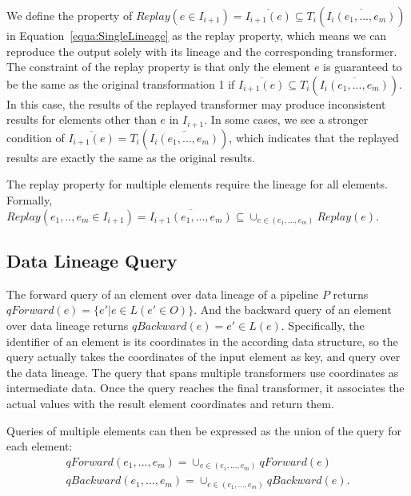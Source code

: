 \documentclass{sig-alternate}
\begin{document}
We define the property of $Replay(e \in I_{i+1}) = \overline{I_{i+1}(e)} \subseteq T_i(\overline{I_i(e_1, ..., e_m)})$ in Equation~\ref{equa:SingleLineage}
as the replay property, which means we can reproduce the output solely with its lineage and the corresponding transformer.
The constraint of the replay property is that only the element $e$ is guaranteed to be the same as the original transformation 1
if $\overline{I_{i+1}(e)} \subseteq T_i(\overline{I_i(e_1, ..., e_m)})$. In this case, the results of the replayed transformer may
produce inconsistent results for elements other than $e$ in $I_{i+1}$. 
In some cases, we see a stronger condition of $\overline{I_{i+1}(e)} = T_i(\overline{I_i(e_1, ..., e_m)})$, which indicates that
the replayed results are exactly the same as the original results.

The replay property for multiple elements require the lineage for all elements. Formally,
$Replay(e_1,..,e_m \in I_{i+1}) = \overline{I_{i+1}(e_1,...,e_m)} \subseteq \cup_{e \in (e_1,...,e_m)} Replay(e) $.

\subsection{Data Lineage Query}
The forward query of an element over data lineage of a pipeline $P$ returns $qForward(e) = \{e' | e \in L(e' \in O)\}$. 
And the backward query of an element over data lineage returns $qBackward(e) = e' \in L(e)$.
Specifically, the identifier of an element is its coordinates in the according data structure, so the query actually takes
the coordinates of the input element as key, and query over the data lineage. The query that spans multiple transformers 
use coordinates as intermediate data. Once the query reaches the final transformer, it associates the actual values
with the result element coordinates and return them.

Queries of multiple elements can then be expressed as the union of the query for each element: 
\begin{equation}
\begin{split}
qForward(e_1, ..., e_m) = \cup_{e \in (e_1, ..., e_m)} qForward(e) \\
qBackward(e_1, ..., e_m) = \cup_{e \in (e_1, ..., e_m)} qBackward(e).
\end{split}
\end{equation}
\end{document}
